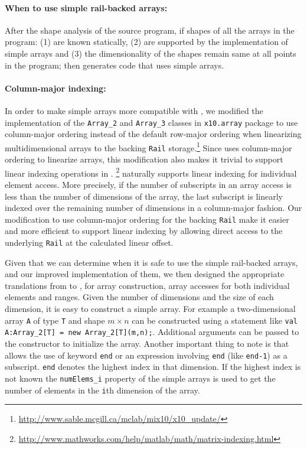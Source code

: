 \paragraph{When to use simple rail-backed arrays:} After the shape analysis of
the source \matlab program, if shapes of all the arrays in the program: (1) are
known statically, (2) are supported by the \xten implementation of simple arrays
and (3) the dimensionality of the shapes remain same at all points in the
program; then \mixten generates \xten code that uses simple arrays. 

\paragraph{Column-major indexing:} In order
to make \xten simple arrays more compatible with \matlab, we modified the
implementation of the \verb|Array_2| and \verb|Array_3| classes in
\verb|x10.array| package to use column-major ordering instead of the default
row-major ordering when linearizing multidimensional arrays to the backing
\verb|Rail| storage.\footnote{
\url{http://www.sable.mcgill.ca/mclab/mix10/x10_update/}} Since \matlab uses
column-major ordering to linearize arrays, this modification also makes it
trivial to support linear indexing operations in \matlab.  \footnote{
\url{http://www.mathworks.com/help/matlab/math/matrix-indexing.html}}
\matlab naturally supports linear indexing for individual element
access. More precisely, if the number of subscripts in an array access
is less than the number of dimensions of the array, the last subscript
is linearly indexed over the remaining number of dimensions in a
column-major fashion. Our modification to use column-major ordering for
the backing \verb|Rail| make it easier and more efficient to support
linear indexing by allowing direct access to the underlying \verb|Rail|
at the calculated linear offset.

Given that we can determine when it is safe to use the simple rail-backed
arrays,  and our improved \xten implementation of them,  we then designed the
appropriate translations from \matlab to \xten, for array construction, array
accesses for both individual elements and ranges. Given the number of dimensions
and the size of each dimension, it is easy to construct a simple array. For
example a two-dimensional array \verb|A| of type \verb|T| and shape $m\times n$
can be constructed using a statement like \texttt{val A:Array\_2[T] = new
Array\_2[T](m,n);}. Additional arguments can be passed to the constructor to
initialize the array. Another important thing to note is that \matlab allows the
use of keyword \verb|end| or an expression involving \verb|end| (like
\verb|end-1|) as a subscript. \verb|end|  denotes the highest index in that
dimension. If the highest index is not known the \verb|numElems_i| property of
the simple arrays is used to get the number of elements in the \verb|i|th
dimension of the array.  


